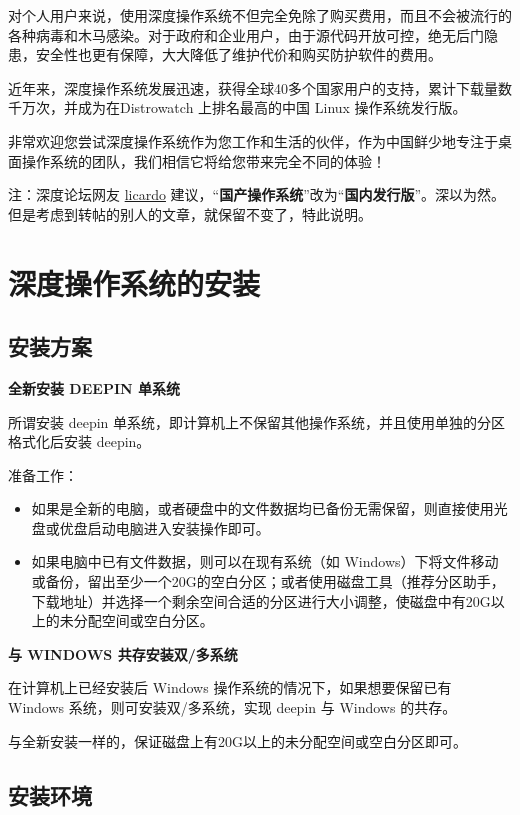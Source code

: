 \documentclass[doctor,openright,twoside]{sjtuthesis}
\providecommand{\tightlist}{%
    \setlength{\itemsep}{0pt}\setlength{\parskip}{0pt}}
\theoremstyle{plain}
\theoremstyle{definition}
\theoremstyle{remark}
\theoremstyle{ocrenumbox}
\theoremstyle{plain}
\newcommand\cqh{“}
\newcommand\cqt{”}
\begin{document}
对个人用户来说，使用深度操作系统不但完全免除了购买费用，而且不会被流行的各种病毒和木马感染。对于政府和企业用户，由于源代码开放可控，绝无后门隐患，安全性也更有保障，大大降低了维护代价和购买防护软件的费用。

近年来，深度操作系统发展迅速，获得全球40多个国家用户的支持，累计下载量数千万次，并成为在Distrowatch
上排名最高的中国 Linux 操作系统发行版。

非常欢迎您尝试深度操作系统作为您工作和生活的伙伴，作为中国鲜少地专注于桌面操作系统的团队，我们相信它将给您带来完全不同的体验！

注：深度论坛网友
\href{https://bbs.deepin.org/forum.php?mod=viewthread\&tid=145309\&page=1\#pid378170}{licardo}
建议，\cqh\textbf{国产操作系统}\cqt 改为\cqh\textbf{国内发行版}\cqt 。深以为然。但是考虑到转帖的别人的文章，就保留不变了，特此说明。

\section{深度操作系统的安装}

\subsection{安装方案}

\textbf{全新安装 DEEPIN 单系统}

所谓安装 deepin
单系统，即计算机上不保留其他操作系统，并且使用单独的分区格式化后安装
deepin。

准备工作：

\begin{itemize}
\tightlist
\item
  如果是全新的电脑，或者硬盘中的文件数据均已备份无需保留，则直接使用光盘或优盘启动电脑进入安装操作即可。
\item
  如果电脑中已有文件数据，则可以在现有系统（如
  Windows）下将文件移动或备份，留出至少一个20G的空白分区；或者使用磁盘工具（推荐分区助手，下载地址）并选择一个剩余空间合适的分区进行大小调整，使磁盘中有20G以上的未分配空间或空白分区。
\end{itemize}

\textbf{与 WINDOWS 共存安装双/多系统}

在计算机上已经安装后 Windows 操作系统的情况下，如果想要保留已有 Windows
系统，则可安装双/多系统，实现 deepin 与 Windows 的共存。

与全新安装一样的，保证磁盘上有20G以上的未分配空间或空白分区即可。

\subsection{安装环境}
\end{document}

